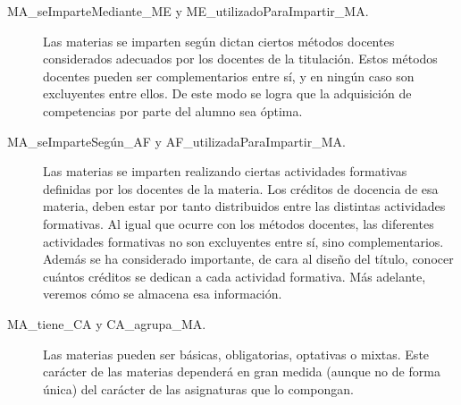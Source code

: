 \begin{description}
    		\item [MA\_seImparteMediante\_ME y ME\_utilizadoParaImpartir\_MA.] Las materias se imparten según dictan ciertos métodos docentes considerados adecuados por los docentes de la titulación. Estos métodos docentes pueden ser complementarios entre sí, y en ningún caso son excluyentes entre ellos. De este modo se logra que la adquisición de competencias por parte del alumno sea óptima.
        
        
    
   		\item [MA\_seImparteSegún\_AF y AF\_utilizadaParaImpartir\_MA.] Las materias se imparten realizando ciertas actividades formativas definidas por los docentes de la materia. Los créditos de docencia de esa materia, deben estar por tanto distribuidos entre las distintas actividades formativas. Al igual que ocurre con los métodos docentes, las diferentes actividades formativas no son excluyentes entre sí, sino complementarios. Además se ha considerado importante, de cara al diseño del título, conocer cuántos créditos se dedican a cada actividad formativa. Más adelante, veremos cómo se almacena esa información.
        
        

		\item[MA\_tiene\_CA y CA\_agrupa\_MA.] Las materias pueden ser básicas, obligatorias, optativas o mixtas. Este carácter de las materias dependerá en gran medida (aunque no de forma única) del carácter de las asignaturas que lo compongan.
		
        


\end{description}
